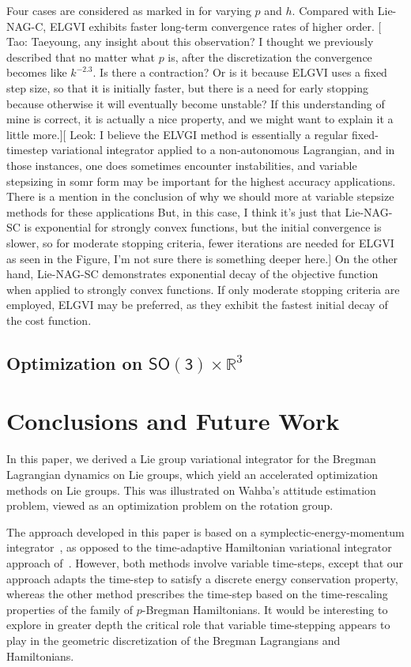 \documentclass[letterpaper, 10pt, conference]{ieeeconf}
\newcommand{\SO}{\ensuremath{\mathsf{SO(3)}}}
\renewcommand{\Re}{\ensuremath{\mathbb{R}}}
\newcommand{\tao}[1]{[{\color{blue} Tao: #1}]}
\newcommand{\leok}[1]{[{\color{orange} Leok: #1}]}
\begin{document}
Four cases are considered as marked in  for varying $p$ and $h$.
Compared with Lie-NAG-C, ELGVI exhibits faster long-term convergence rates of higher order. \tao{Taeyoung, any insight about this observation? I thought we previously described that no matter what $p$ is, after the discretization the convergence becomes like $k^{-2.3}$. Is there a contraction? Or is it because ELGVI uses a fixed step size, so that it is initially faster, but there is a need for early stopping because otherwise it will eventually become unstable? If this understanding of mine is correct, it is actually a nice property, and we might want to explain it a little more.}\leok{I believe the ELVGI method is essentially a regular fixed-timestep variational integrator applied to a non-autonomous Lagrangian, and in those instances, one does sometimes encounter instabilities, and variable stepsizing in somr form may be important for the highest accuracy applications. There is a mention in the conclusion of why we should more at variable stepsize methods for these applications  But, in this case, I think it's just that Lie-NAG-SC is exponential for strongly convex functions, but the initial convergence is slower, so for moderate stopping criteria, fewer iterations are needed for ELGVI as seen in the Figure, I'm not sure there is something deeper here.}
On the other hand, Lie-NAG-SC demonstrates exponential decay of the objective function when applied to strongly convex functions. If only moderate stopping criteria are employed, ELGVI may be preferred, as they exhibit the fastest initial decay of the cost function.

\subsection{Optimization on $\SO\times \Re^3$}

\section{Conclusions and Future Work}
In this paper, we derived a Lie group variational integrator for the Bregman Lagrangian dynamics on Lie groups, which yield an accelerated optimization methods on Lie groups. This was illustrated on Wahba's attitude estimation problem, viewed as an optimization problem on the rotation group.

The approach developed in this paper is based on a symplectic-energy-momentum integrator~\cite{KaMaOr1999}, as opposed to the time-adaptive Hamiltonian variational integrator approach of~\cite{DuScLe2021}. However, both methods involve variable time-steps, except that our approach adapts the time-step to satisfy a discrete energy conservation property, whereas the other method prescribes the time-step based on the time-rescaling properties of the family of $p$-Bregman Hamiltonians. It would be interesting to explore in greater depth the critical role that variable time-stepping appears to play in the geometric discretization of the Bregman Lagrangians and Hamiltonians.
\end{document}
